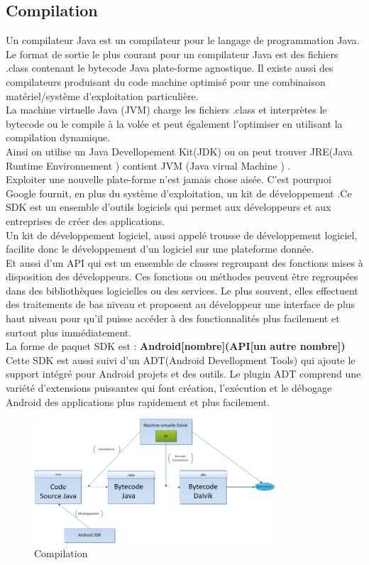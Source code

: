 \subsection{Compilation}
Un compilateur Java est un compilateur pour le langage de programmation Java. Le format de sortie le plus courant pour un compilateur Java est des fichiers .class contenant le bytecode Java plate-forme agnostique. Il existe aussi des compilateurs produisant du code machine optimisé pour une combinaison matériel/système d'exploitation particulière.\\
La machine virtuelle Java (JVM) charge les fichiers .class et interprètes le bytecode ou le compile à la volée et peut également l'optimiser en utilisant la compilation dynamique.\\
Ainsi on utilise un Java Devellopement Kit(JDK) ou on peut trouver JRE(Java Runtime Environnement ) contient JVM (Java virual Machine ) .\\
Exploiter une nouvelle plate-forme n’est jamais chose aisée. C’est pourquoi Google fournit, en plus du système d’exploitation, un kit de développement .Ce SDK est un ensemble d’outils logiciels qui permet aux développeurs et aux entreprises de créer des applications.\\
Un kit de développement logiciel, aussi appelé trousse de développement logiciel, facilite donc  le développement d'un logiciel sur une plateforme donnée.\\
Et aussi d’un API qui est un ensemble de classes regroupant des fonctions mises à disposition des développeurs. Ces fonctions ou méthodes peuvent être regroupées dans des bibliothèques logicielles ou des services. Le plus souvent, elles effectuent des traitements de bas niveau et proposent au développeur une interface de plus haut niveau pour qu’il puisse accéder à des fonctionnalités plus facilement et surtout plus immédiatement.\\
La forme de paquet SDK est :
\textbf{Android[nombre](API[un autre nombre])}\\
Cette SDK  est aussi suivi d’un ADT(Android Devellopment Tools) qui ajoute le support intégré pour Android projets et des outils. Le plugin ADT comprend une variété d'extensions puissantes qui font création, l'exécution et le débogage Android des applications plus rapidement et plus facilement.\\
	\begin{figure}[!h]
    	\center
    		\includegraphics[width=0.8\textwidth]{image/compile}
   		\caption{Compilation}
    	\label{Compilation}
	\end{figure}
